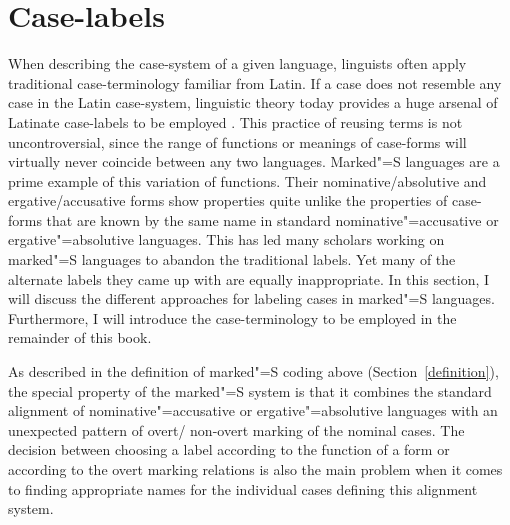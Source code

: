 
\section{Case-labels}\label{label}

When describing the case-system of a given language, linguists often apply traditional case-terminology familiar from Latin. 
If a case does not resemble any case in the Latin case-system, linguistic theory today provides a huge arsenal of Latinate case-labels to be employed \citep[cf.][]{Haspelmath:2009}. 
This practice of reusing terms is not uncontroversial, since the range of functions or meanings of case-forms will virtually never coincide between any two languages. 
Marked"=S languages are a prime example of this variation of functions. 
Their nominative/absolutive and ergative/accusative forms show properties quite unlike the properties of case-forms that are known by the same name in standard nominative"=accusative or ergative"=absolutive languages.
This has led many scholars working on marked"=S languages to abandon the traditional labels.
Yet many of the alternate labels they came up with are equally inappropriate. 
In this section, I will discuss the different approaches for labeling cases in marked"=S languages.
Furthermore, I will introduce the case-terminology to be employed in the remainder of this book.

As described in the definition of marked"=S coding above (Section~\ref{definition}), the special property of the marked"=S system is that it combines the standard alignment of nominative"=accusative or ergative"=absolutive languages with an unexpected pattern of overt/ non-overt marking of the nominal cases. 
The decision between choosing a label according to the function of a form or according to the overt marking relations is also the main problem when it comes to finding appropriate names for the individual cases defining this alignment system. 
   
